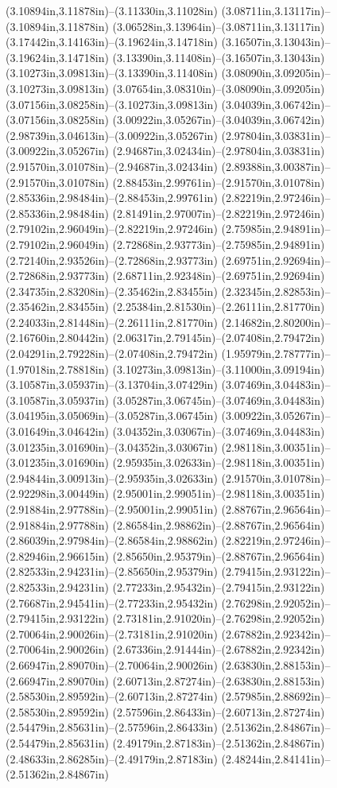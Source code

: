 (3.10894in,3.11878in)--(3.11330in,3.11028in) (3.08711in,3.13117in)--(3.10894in,3.11878in) (3.06528in,3.13964in)--(3.08711in,3.13117in) (3.17442in,3.14163in)--(3.19624in,3.14718in) (3.16507in,3.13043in)--(3.19624in,3.14718in) (3.13390in,3.11408in)--(3.16507in,3.13043in) (3.10273in,3.09813in)--(3.13390in,3.11408in) (3.08090in,3.09205in)--(3.10273in,3.09813in) (3.07654in,3.08310in)--(3.08090in,3.09205in) (3.07156in,3.08258in)--(3.10273in,3.09813in) (3.04039in,3.06742in)--(3.07156in,3.08258in) (3.00922in,3.05267in)--(3.04039in,3.06742in) (2.98739in,3.04613in)--(3.00922in,3.05267in) (2.97804in,3.03831in)--(3.00922in,3.05267in) (2.94687in,3.02434in)--(2.97804in,3.03831in) (2.91570in,3.01078in)--(2.94687in,3.02434in) (2.89388in,3.00387in)--(2.91570in,3.01078in) (2.88453in,2.99761in)--(2.91570in,3.01078in) (2.85336in,2.98484in)--(2.88453in,2.99761in) (2.82219in,2.97246in)--(2.85336in,2.98484in) (2.81491in,2.97007in)--(2.82219in,2.97246in) (2.79102in,2.96049in)--(2.82219in,2.97246in) (2.75985in,2.94891in)--(2.79102in,2.96049in) (2.72868in,2.93773in)--(2.75985in,2.94891in) (2.72140in,2.93526in)--(2.72868in,2.93773in) (2.69751in,2.92694in)--(2.72868in,2.93773in) (2.68711in,2.92348in)--(2.69751in,2.92694in) (2.34735in,2.83208in)--(2.35462in,2.83455in) (2.32345in,2.82853in)--(2.35462in,2.83455in) (2.25384in,2.81530in)--(2.26111in,2.81770in) (2.24033in,2.81448in)--(2.26111in,2.81770in) (2.14682in,2.80200in)--(2.16760in,2.80442in) (2.06317in,2.79145in)--(2.07408in,2.79472in) (2.04291in,2.79228in)--(2.07408in,2.79472in) (1.95979in,2.78777in)--(1.97018in,2.78818in) (3.10273in,3.09813in)--(3.11000in,3.09194in) (3.10587in,3.05937in)--(3.13704in,3.07429in) (3.07469in,3.04483in)--(3.10587in,3.05937in) (3.05287in,3.06745in)--(3.07469in,3.04483in) (3.04195in,3.05069in)--(3.05287in,3.06745in) (3.00922in,3.05267in)--(3.01649in,3.04642in) (3.04352in,3.03067in)--(3.07469in,3.04483in) (3.01235in,3.01690in)--(3.04352in,3.03067in) (2.98118in,3.00351in)--(3.01235in,3.01690in) (2.95935in,3.02633in)--(2.98118in,3.00351in) (2.94844in,3.00913in)--(2.95935in,3.02633in) (2.91570in,3.01078in)--(2.92298in,3.00449in) (2.95001in,2.99051in)--(2.98118in,3.00351in) (2.91884in,2.97788in)--(2.95001in,2.99051in) (2.88767in,2.96564in)--(2.91884in,2.97788in) (2.86584in,2.98862in)--(2.88767in,2.96564in) (2.86039in,2.97984in)--(2.86584in,2.98862in) (2.82219in,2.97246in)--(2.82946in,2.96615in) (2.85650in,2.95379in)--(2.88767in,2.96564in) (2.82533in,2.94231in)--(2.85650in,2.95379in) (2.79415in,2.93122in)--(2.82533in,2.94231in) (2.77233in,2.95432in)--(2.79415in,2.93122in) (2.76687in,2.94541in)--(2.77233in,2.95432in) (2.76298in,2.92052in)--(2.79415in,2.93122in) (2.73181in,2.91020in)--(2.76298in,2.92052in) (2.70064in,2.90026in)--(2.73181in,2.91020in) (2.67882in,2.92342in)--(2.70064in,2.90026in) (2.67336in,2.91444in)--(2.67882in,2.92342in) (2.66947in,2.89070in)--(2.70064in,2.90026in) (2.63830in,2.88153in)--(2.66947in,2.89070in) (2.60713in,2.87274in)--(2.63830in,2.88153in) (2.58530in,2.89592in)--(2.60713in,2.87274in) (2.57985in,2.88692in)--(2.58530in,2.89592in) (2.57596in,2.86433in)--(2.60713in,2.87274in) (2.54479in,2.85631in)--(2.57596in,2.86433in) (2.51362in,2.84867in)--(2.54479in,2.85631in) (2.49179in,2.87183in)--(2.51362in,2.84867in) (2.48633in,2.86285in)--(2.49179in,2.87183in) (2.48244in,2.84141in)--(2.51362in,2.84867in) 